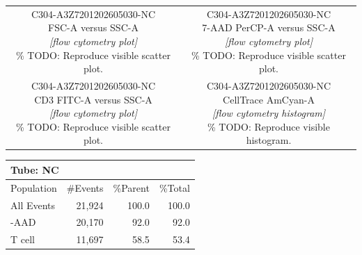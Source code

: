 \documentclass[UTF8,10pt,a4paper,fontset=fandol]{ctexart}
\begin{document}
\begin{center}
\begin{tabular}{cc}
\fbox{\parbox[c][3.0cm][c]{0.40\linewidth}{\centering
\scriptsize C304-A3Z7201202605030-NC\\
\tiny FSC-A versus SSC-A\\
\vspace{0.4cm}
\textit{[flow cytometry plot]}\\
\tiny \% TODO: Reproduce visible scatter plot.}}
&
\fbox{\parbox[c][3.0cm][c]{0.40\linewidth}{\centering
\scriptsize C304-A3Z7201202605030-NC\\
\tiny 7-AAD PerCP-A versus SSC-A\\
\vspace{0.4cm}
\textit{[flow cytometry plot]}\\
\tiny \% TODO: Reproduce visible scatter plot.}}
\\[0.5em]
\fbox{\parbox[c][3.0cm][c]{0.40\linewidth}{\centering
\scriptsize C304-A3Z7201202605030-NC\\
\tiny CD3 FITC-A versus SSC-A\\
\vspace{0.4cm}
\textit{[flow cytometry plot]}\\
\tiny \% TODO: Reproduce visible scatter plot.}}
&
\fbox{\parbox[c][3.0cm][c]{0.40\linewidth}{\centering
\scriptsize C304-A3Z7201202605030-NC\\
\tiny CellTrace AmCyan-A\\
\vspace{0.4cm}
\textit{[flow cytometry histogram]}\\
\tiny \% TODO: Reproduce visible histogram.}}
\end{tabular}
\end{center}

\vspace{0.5em}

\begin{center}
\begin{tabular}{|l|r|r|r|}
\hline
\multicolumn{4}{|l|}{Tube: NC}\\
\hline
Population & \#Events & \%Parent & \%Total\\
\hline
All Events & 21,924 & 100.0 & 100.0\\
\quad 7-AAD & 20,170 & 92.0 & 92.0\\
\quad T cell & 11,697 & 58.5 & 53.4\\
\hline
\end{tabular}
\end{center}
\end{document}
